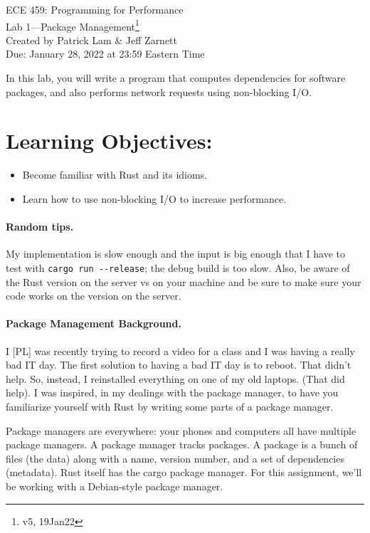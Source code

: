 \documentclass[12pt]{article}
\renewcommand{\_}{\kern-1.5pt\textunderscore\kern-1.5pt}
\begin{document}
\begin{center}
{\Large ECE 459: Programming for Performance}\\
{\Large Lab 1---Package Management\footnote{v5, 19Jan22}}\\[1em]
Created by Patrick Lam \& Jeff Zarnett\\
Due: January 28, 2022 at 23:59 Eastern Time
\end{center}


\vspace{1em}
In this lab, you will write a program that computes dependencies for software packages, and also performs network requests using non-blocking I/O.

\section*{Learning Objectives:}
\begin{itemize}
	\item Become familiar with Rust and its idioms.
	\item Learn how to use non-blocking I/O to increase performance.
\end{itemize}

\paragraph*{Random tips.} My implementation is slow enough and the input is big enough that I have to test with \verb+cargo run --release+; the debug build is too slow. Also, be aware of the Rust version on the server vs on your machine and be sure to make sure your code works on the version on the server.


\paragraph*{Package Management Background.}
I [PL] was recently trying to record a video for a class and I was having a really bad IT day. The first solution to having a bad IT day is to reboot. That didn't help. So, instead, I reinstalled everything on one of my old laptops. (That did help). I was inspired, in my dealings with the package manager, to have you familiarize yourself with Rust by writing some parts of a package manager. \par

\vspace{1em}
Package managers are everywhere: your phones and computers all have multiple package managers. A package manager tracks packages. A package is a bunch of files (the data) along with a name, version number, and a set of dependencies (metadata). Rust itself has the cargo package manager. For this assignment, we'll be working with a Debian-style package manager. \par
\end{document}
